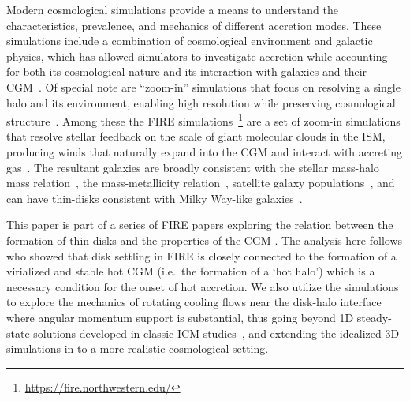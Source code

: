 \documentclass[fleqn,usenatbib]{mnras}
\begin{document}
Modern cosmological simulations provide a means to understand the characteristics, prevalence, and mechanics of different accretion modes.
These simulations include a combination of cosmological environment and galactic physics, which has allowed simulators to investigate accretion while accounting for both its cosmological nature and its interaction with galaxies and their CGM~\citep[e.g.][]{Oppenheimer2010, Stewart2011, Fernandez2012, Ford2014, Angles-Alcazar2017, Hafen2019, Hafen2020, Ho2019, Rottgers2020, Trapp2021}.
Of special note are ``zoom-in'' simulations that focus on resolving a single halo and its environment, enabling high resolution while preserving cosmological structure~\citep[e.g.][]{Katz1993, Wang2015, Agertz2020}.
Among these the FIRE simulations~\citep{Hopkins2014, Hopkins2018b}\footnote{\url{https://fire.northwestern.edu/}} are a set of zoom-in simulations that resolve stellar feedback on the scale of giant molecular clouds in the ISM, producing winds that naturally expand into the CGM and interact with accreting gas~\citep{Muratov2015, Muratov2017, Hafen2019, Hafen2020}.
The resultant galaxies are broadly consistent with the stellar mass-halo mass relation~\citep{Hopkins2017}, the mass-metallicity relation~\citep{Ma2016a}, satellite galaxy populations~\citep{Wetzel2016, Garrison-Kimmel2019a}, and can have thin-disks consistent with Milky Way-like galaxies~\citep{Garrison-Kimmel2018, El-Badry2018}.

This paper is part of a series of FIRE papers exploring the relation between the formation of thin disks and the properties of the CGM \citep{Stern2021, Yu21, Gurvich_in_prep, Byrne_in_prep}. The analysis here follows \cite{Stern2021}  who showed that disk settling in FIRE is closely connected to the formation of a virialized and stable hot CGM (i.e.~the formation of a `hot halo') which is a necessary condition for the onset of hot accretion. 
We also utilize the simulations to explore the mechanics of rotating cooling flows near the disk-halo interface where angular momentum support is substantial,  thus going beyond 1D steady-state solutions developed in classic ICM studies~\citep[e.g.][]{Cowie1980}, and extending the idealized 3D simulations in \cite{Stern2020} to a more realistic cosmological setting. 
\end{document}
